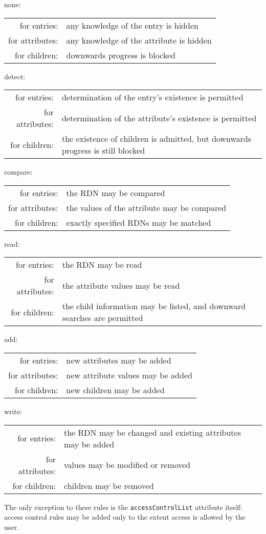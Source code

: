 \begin{describe}
\item[none:]
\begin{tabular}[t]{rp{3.35in}}
for entries:&	 	any knowledge of the entry is hidden\\
for attributes:&	any knowledge of the attribute is hidden\\
for children:&		downwards progress is blocked
\end{tabular}

\item[detect:]
\begin{tabular}[t]{rp{3.35in}}
for entries:& determination of the entry's existence is permitted\\
for attributes:& determination of the attribute's existence is permitted\\
for children:& the existence of children is admitted, but downwards progress is still blocked\\
\end{tabular}

\item[compare:]
\begin{tabular}[t]{rp{3.35in}}
for entries:& the RDN may be compared\\
for attributes:& the values of the attribute may be compared\\
for children:& exactly specified RDNs may be matched\\
\end{tabular}

\item[read:]
\begin{tabular}[t]{rp{3.35in}}
for entries:& the RDN may be read\\
for attributes:& the attribute values may be read\\
for children:& the child information may be listed, and downward searches are permitted\\
\end{tabular}

\item[add:]
\begin{tabular}[t]{rp{3.35in}}
for entries:& new attributes may be added\\
for attributes:& new attribute values may be added\\
for children:& new children may be added\\
\end{tabular}

\item[write:]
\begin{tabular}[t]{rp{3.35in}}
for entries:& the RDN may be changed and existing attributes may be added\\
for attributes:& values may be modified or removed\\
for children:& children may be removed\\
\end{tabular}
\end{describe}
The only exception to these rules is the \verb"accessControlList" attribute
itself: access control rules may be added only to the extent access is
allowed by the user.

